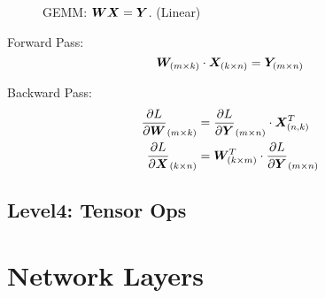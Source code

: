\documentclass[9pt,twocolumn,times]{article}
\begin{document}
\begin{figure}[h]
	\centering
	\resizebox{0.618\columnwidth}{!}{%
		
	}
	\caption{GEMM: ${\bm{W}} {\bm{X}} = {\bm{Y}}$. (Linear)}
\end{figure}

	Forward Pass:
	\begin{equation}
		{\bm{W}}_{(m\times k)} \cdot {\bm{X}}_{(k\times n)} = {\bm{Y}}_{(m\times n)}
	\end{equation}

	Backward Pass:
	\begin{align}
		\frac{\partial L}{\partial{\bm{W}}}_{(m\times k)} &=
		\frac{\partial L}{\partial{\bm{Y}}}_{(m\times n)} \cdot {\bm{X}}^T_{(n,k)}\\
		\frac{\partial L}{\partial{\bm{X}}}_{(k\times n)} &=
		{\bm{W}}^T_{(k\times m)} \cdot \frac{\partial L}{\partial {\bm{Y}}}_{(m\times n)}
	\end{align}

\subsection{Level4: Tensor Ops}

\section{Network Layers}
\end{document}
